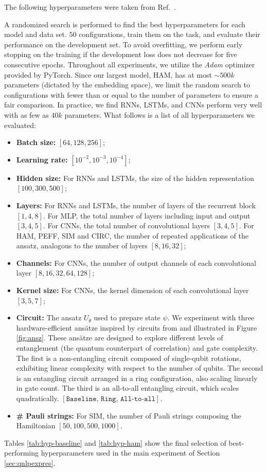 \documentclass[../main.tex]{subfiles}
\begin{document}
The following hyperparameters were taken from Ref.~\cite{tiblias2025an}.

A randomized search is performed to find the best hyperparameters for each model and data set. $50$ configurations, train them on the task, and evaluate their performance on the development set. To avoid overfitting, we perform early stopping on the training if the development loss does not decrease for five consecutive epochs. Throughout all experiments, we utilize the \textit{Adam} optimizer provided by PyTorch. Since our largest model, HAM, has at most $\sim500k$ parameters (dictated by the embedding space), we limit the random search to configurations with fewer than or equal to the number of parameters to ensure a fair comparison. In practice, we find RNNs, LSTMs, and CNNs perform very well with as few as $40k$ parameters. What follows is a list of all hyperparameters we evaluated:
\begin{itemize}
    \item \textbf{Batch size:} $[64, 128, 256]$;
    \item \textbf{Learning rate:} $[10^{-2}, 10^{-3}, 10^{-4}]$; 
    \item \textbf{Hidden size:} For RNNs and LSTMs, the size of the hidden representation $[100, 300, 500]$;
    \item \textbf{Layers:} For RNNs and LSTMs, the number of layers of the recurrent block $[1, 4, 8]$. For MLP, the total number of layers including input and output $[ 3, 4, 5 ]$. For CNNs, the total number of convolutional layers $[ 3, 4, 5 ]$. For HAM, PEFF, SIM and CIRC, the number of repeated applications of the ansatz, analogous to the number of layers $[8, 16, 32]$;
    \item \textbf{Channels:} For CNNs, the number of output channels of each convolutional layer $[ 8, 16, 32, 64, 128]$;
    \item \textbf{Kernel size:} For CNNs, the kernel dimension of each convolutional layer $[ 3, 5, 7 ]$;
    \item \textbf{Circuit:} The ansatz $U_\theta$ used to prepare state $\psi$. We experiment with three hardware-efficient ans\"atze inspired by circuits from \cite{Sim2019circ} and illustrated in Figure \ref{fig:ansz}. These ans\"atze are designed to explore different levels of entanglement (the quantum counterpart of correlation) and gate complexity. The first is a non-entangling circuit composed of single-qubit rotations, exhibiting linear complexity with respect to the number of qubits. The second is an entangling circuit arranged in a ring configuration, also scaling linearly in gate count. The third is an all-to-all entangling circuit, which scales quadratically. $[\texttt{Baseline, Ring, All-to-all}]$.
    \item \textbf{\# Pauli strings:} For SIM, the number of Pauli strings composing the Hamiltonian $[50, 100, 500, 1000]$.
\end{itemize}
Tables \ref{tab:hyp-baseline} and \ref{tab:hyp-ham} show the final selection of best-performing hyperparameters used in the main experiment of Section \ref{sec:qnlpexpres}.
\end{document}
